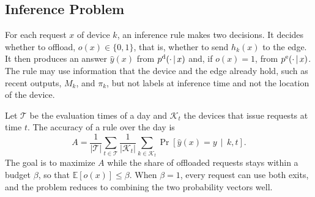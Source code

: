 \subsection{Inference Problem}

For each request $x$ of device $k$, an inference rule makes two decisions. It decides whether to offload, $o(x)\in\{0,1\}$, that is, whether to send $h_k(x)$ to the edge. It then produces an answer $\hat y(x)$ from $p^{\mathrm{d}}(\cdot\,|\,x)$ and, if $o(x)=1$, from $p^{\mathrm{e}}(\cdot\,|\,x)$. The rule may use information that the device and the edge already hold, such as recent outputs, $M_k$, and $\pi_k$, but not labels at inference time and not the location of the device.

Let $\mathcal{T}$ be the evaluation times of a day and $\mathcal{K}_t$ the devices that issue requests at time $t$. The accuracy of a rule over the day is
\begin{equation}
A=\frac{1}{|\mathcal{T}|}\sum_{t\in\mathcal{T}}\frac{1}{|\mathcal{K}_t|}\sum_{k\in\mathcal{K}_t}\Pr\!\left[\hat y(x)=y\,\middle|\,k,t\right].
\label{eq:accuracy}
\end{equation}
The goal is to maximize $A$ while the share of offloaded requests stays within a budget $\beta$, so that $\mathbb{E}[o(x)]\le\beta$. When $\beta=1$, every request can use both exits, and the problem reduces to combining the two probability vectors well.
